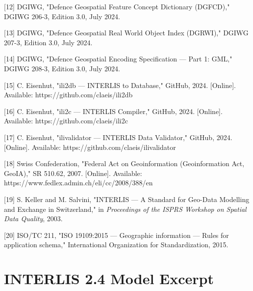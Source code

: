 \documentclass[conference]{IEEEtran}
\begin{document}
[12] DGIWG, "Defence Geospatial Feature Concept Dictionary (DGFCD)," DGIWG 206-3, Edition 3.0, July 2024.

[13] DGIWG, "Defence Geospatial Real World Object Index (DGRWI)," DGIWG 207-3, Edition 3.0, July 2024.

[14] DGIWG, "Defence Geospatial Encoding Specification — Part 1: GML," DGIWG 208-3, Edition 3.0, July 2024.

[15] C. Eisenhut, "ili2db — INTERLIS to Database," GitHub, 2024. [Online]. Available: https://github.com/claeis/ili2db

[16] C. Eisenhut, "ili2c — INTERLIS Compiler," GitHub, 2024. [Online]. Available: https://github.com/claeis/ili2c

[17] C. Eisenhut, "ilivalidator — INTERLIS Data Validator," GitHub, 2024. [Online]. Available: https://github.com/claeis/ilivalidator

[18] Swiss Confederation, "Federal Act on Geoinformation (Geoinformation Act, GeoIA)," SR 510.62, 2007. [Online]. Available: https://www.fedlex.admin.ch/eli/cc/2008/388/en

[19] S. Keller and M. Salvini, "INTERLIS — A Standard for Geo-Data Modelling and Exchange in Switzerland," in \textit{Proceedings of the ISPRS Workshop on Spatial Data Quality}, 2003.

[20] ISO/TC 211, "ISO 19109:2015 — Geographic information — Rules for application schema," International Organization for Standardization, 2015.



\appendices
\section{INTERLIS 2.4 Model Excerpt}
\end{document}
